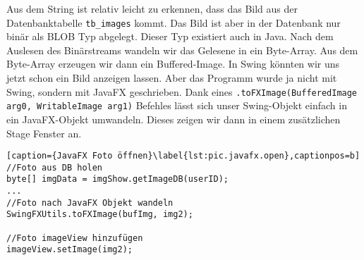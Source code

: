 Aus dem String ist relativ leicht zu erkennen, dass das Bild aus der Datenbanktabelle \texttt{tb\_images} kommt. Das Bild ist aber in der Datenbank nur binär als BLOB Typ abgelegt. Dieser Typ existiert auch in Java. Nach dem Auslesen des Binärstreams wandeln wir das Gelesene in ein Byte-Array. Aus dem Byte-Array erzeugen wir dann ein Buffered-Image. In Swing könnten wir uns jetzt schon ein Bild anzeigen lassen. Aber das Programm wurde ja nicht mit Swing, sondern mit JavaFX geschrieben. Dank eines \texttt{.toFXImage(BufferedImage arg0, WritableImage arg1)} Befehles lässt sich unser Swing-Objekt einfach in ein JavaFX-Objekt umwandeln. Dieses zeigen wir dann in einem zusätzlichen Stage Fenster an. %
\begin{lstlisting}[caption={JavaFX Foto öffnen}\label{lst:pic.javafx.open},captionpos=b]
//Foto aus DB holen
byte[] imgData = imgShow.getImageDB(userID);
...
//Foto nach JavaFX Objekt wandeln
SwingFXUtils.toFXImage(bufImg, img2);

//Foto imageView hinzufügen
imageView.setImage(img2);
\end{lstlisting}

